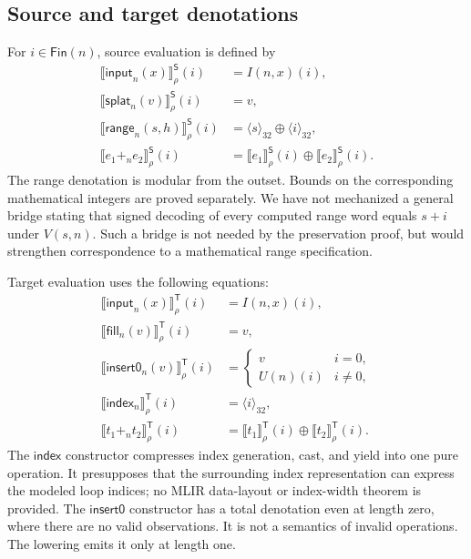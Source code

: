 \documentclass[a4paper,USenglish,anonymous]{lipics-v2021}
\newcommand{\Fin}{\mathsf{Fin}}
\newcommand{\Src}{\mathsf{S}}
\newcommand{\Tgt}{\mathsf{T}}
\newcommand{\word}[1]{\langle #1\rangle_{32}}
\newcommand{\se}[1]{\llbracket #1\rrbracket^{\Src}_{\rho}}
\newcommand{\te}[1]{\llbracket #1\rrbracket^{\Tgt}_{\rho}}
\newcommand{\op}[1]{\ensuremath{\mathsf{#1}}}
\newcommand{\code}[1]{\texttt{\detokenize{#1}}}
\begin{document}
\subsection{Source and target denotations}
For $i\in\Fin(n)$, source evaluation is defined by
\begin{align*}
 \se{\op{input}_n(x)}(i)&=I(n,x)(i),\\
 \se{\op{splat}_n(v)}(i)&=v,\\
 \se{\op{range}_n(s,h)}(i)&=\word{s}\oplus\word{i},\\
 \se{e_1+_n e_2}(i)&=\se{e_1}(i)\oplus\se{e_2}(i).
\end{align*}
The range denotation is modular from the outset. Bounds on the corresponding
mathematical integers are proved separately. We have not mechanized a general
bridge stating that signed decoding of every computed range word equals
$s+i$ under $V(s,n)$. Such a bridge is not needed by the preservation proof,
but would strengthen correspondence to a mathematical range specification.

Target evaluation uses the following equations:
\begin{align*}
 \te{\op{input}_n(x)}(i)&=I(n,x)(i),\\
 \te{\op{fill}_n(v)}(i)&=v,\\
 \te{\op{insert0}_n(v)}(i)&=
       \begin{cases}v&i=0,\\U(n)(i)&i\ne0,\end{cases}\\
 \te{\op{index}_n}(i)&=\word{i},\\
 \te{t_1+_n t_2}(i)&=\te{t_1}(i)\oplus\te{t_2}(i).
\end{align*}
The \op{index} constructor compresses index generation, cast, and yield
into one pure operation. It presupposes that the surrounding index
representation can express the modeled loop indices; no MLIR data-layout
or index-width theorem is provided. The \op{insert0} constructor has a
total denotation even at length zero, where there are no valid observations.
It is not a semantics of invalid \code{tensor.insert} operations. The
lowering emits it only at length one.
\end{document}
